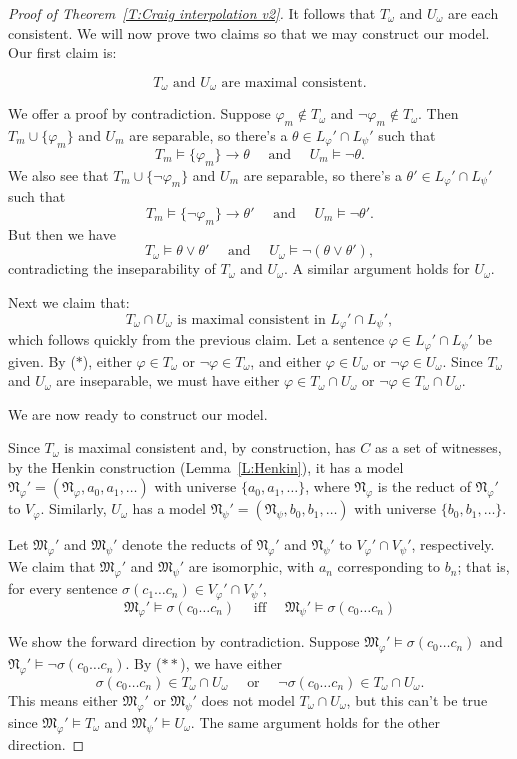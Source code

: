 \documentclass{scrartcl}
\renewcommand{\phi}{\varphi}
\newcommand{\FM}{\mathfrak{M}}
\newcommand{\FN}{\mathfrak{N}}
\begin{document}
\begin{proof}[Proof of Theorem~\ref{T:Craig interpolation v2}]
It follows that $T_\omega$ and $U_\omega$ are each consistent. We will now prove two claims so that we may construct our model. Our first claim is:

\[
T_\omega \text{ and } U_\omega \text{ are maximal consistent.}\tag{$*$}
\]

We offer a proof by contradiction. Suppose $\phi_m\not\in T_\omega$ and $\neg\phi_m\not\in T_\omega$. Then $T_m\cup\{\phi_m\}$ and $U_m$ are separable, so there's a $\theta\in L_\phi '\cap L_\psi '$ such that
\[
T_m\models\{\phi_m\}\rightarrow \theta \quad\text{ and }\quad U_m\models\neg\theta.
\]
We also see that $T_m\cup\{\neg\phi_m\}$ and $U_m$ are separable, so there's a $\theta'\in L_\phi '\cap L_\psi '$ such that
\[
T_m\models\{\neg\phi_m\}\rightarrow \theta' \quad\text{ and }\quad U_m\models\neg\theta'.
\]
But then we have
\[
T_\omega\models \theta\vee\theta ' \quad \text{ and }\quad U_\omega\models\neg(\theta\vee\theta'),
\]
contradicting the inseparability of $T_\omega$ and $U_\omega$. A similar argument holds for $U_\omega$.

Next we claim that:
\[
T_\omega\cap U_\omega \text{ is maximal consistent in }L_\phi'\cap L_\psi', \tag{$**$}
\]
which follows quickly from the previous claim. Let a sentence $\phi\in L_\phi'\cap L_\psi'$ be given. By ($*$), either $\phi\in T_\omega$ or $\neg\phi\in T_\omega$, and either $\phi\in U_\omega$ or $\neg\phi\in U_\omega$. Since $T_\omega$ and $U_\omega$ are inseparable, we must have either $\phi\in T_\omega\cap U_\omega$ or $\neg\phi\in T_\omega\cap U_\omega$.

We are now ready to construct our model.

Since $T_\omega$ is maximal consistent and, by construction, has $C$ as a set of witnesses, by the Henkin construction (Lemma~\ref{L:Henkin}), it has a model $\FN_\phi ' = (\FN_\phi,a_0,a_1,\dots)$ with universe $\{ a_0,a_1,\dots \}$, where $\FN_\phi$ is the reduct of $\FN_\phi '$ to $V_\phi$. Similarly, $U_\omega$ has a model $\FN_\psi'=(\FN_\psi,b_0,b_1,\dots)$ with universe $\{b_0,b_1,\dots\}$.

Let $\FM_\phi'$ and $\FM_\psi '$ denote the reducts of $\FN_\phi '$ and $\FN_\psi '$ to $V_\phi'\cap V_\psi '$, respectively. We claim that $\FM_\phi'$ and $\FM_\psi '$ are isomorphic, with $a_n$ corresponding to $b_n$; that is, for every sentence $\sigma(c_1\dots c_n)\in V_\phi'\cap V_\psi '$,
\[
\FM_\phi'\models \sigma(c_0\dots c_n) \quad\text{ iff }\quad \FM_\psi'\models \sigma(c_0\dots c_n)
\]

We show the forward direction by contradiction. Suppose $\FM_\phi'\models \sigma(c_0\dots c_n)$ and $\FN_\phi'\models \neg\sigma(c_0\dots c_n)$. By ($**$), we have either
\[
\sigma(c_0\dots c_n)\in T_\omega\cap U_\omega\quad \text{ or }\quad \neg\sigma(c_0\dots c_n)\in T_\omega\cap U_\omega.
\]
This means either $\FM_\phi'$ or $\FM_\psi'$ does not model $T_\omega\cap U_\omega$, but this can't be true since $\FM_\phi'\models T_\omega$ and $\FM_\psi'\models U_\omega$. The same argument holds for the other direction.


\end{proof}
\end{document}
